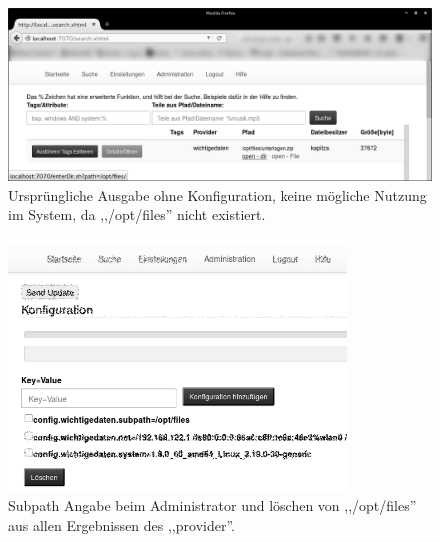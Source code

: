 \documentclass[oneside, ngerman, toc=bibliography,bibliography=totoc,listof=entryprefix, open=right,numbers=noenddot,fontsize=12pt]{scrbook}
\begin{document}
\begin{figure}[htbp] 
    \centering
    \includegraphics[width=\textwidth]{Masterarbeit_Bilder/original_data_example.png}
    \caption{Ursprüngliche Ausgabe ohne Konfiguration, keine mögliche Nutzung im System, da ,,/opt/files'' nicht existiert.}
    \label{fig:www-orig}
\end{figure}  
\begin{figure}[htbp] 
    \centering
    \includegraphics[width=0.8\textwidth]{Masterarbeit_Bilder/admin_remove_sub_cfg.png}
    \caption{Subpath Angabe beim Administrator und löschen von ,,/opt/files'' aus allen Ergebnissen des ,,provider''.}
    \label{fig:www-subpath}
\end{figure}  
\end{document}
